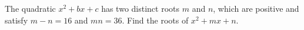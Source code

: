 The quadratic $x^2+bx+c$ has two distinct roots $m$ and $n$, which are positive and satisfy $m-n=16$ and $mn=36$. Find the roots of $x^2+mx+n$.
